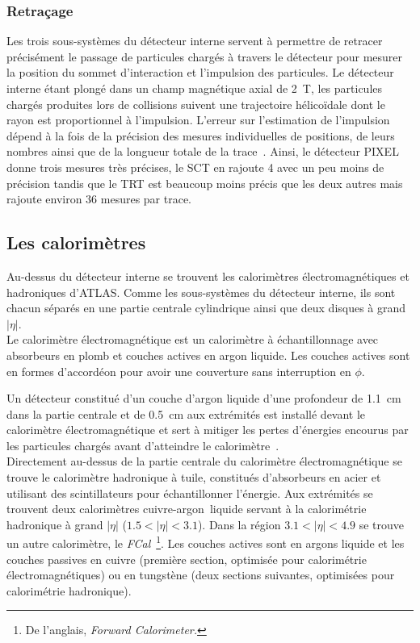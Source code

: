 \subsubsection{Retraçage}

Les trois sous-systèmes du détecteur interne servent à permettre de
retracer précisément le passage de particules chargés à travers le
détecteur pour mesurer la position du sommet d'interaction et
l'impulsion des particules. Le détecteur interne étant plongé dans un
champ magnétique axial de 2~T, les particules chargés produites lors
de collisions suivent une trajectoire hélicoïdale dont le rayon est
proportionnel à l'impulsion. L'erreur sur l'estimation de l'impulsion
dépend à la fois de la précision des mesures individuelles de
positions, de leurs nombres ainsi que de la longueur totale de la
trace~\cite{olive_detectors_2014}. Ainsi, le détecteur PIXEL donne
trois mesures très précises, le SCT en rajoute 4 avec un peu moins de
précision tandis que le TRT est beaucoup moins précis que les deux autres mais
rajoute environ 36 mesures par trace.

\subsection{Les calorimètres}
\label{sec:lhc_atlas:atlas:calo}

Au-dessus du détecteur interne se trouvent les calorimètres
électromagnétiques et hadroniques d'ATLAS. Comme les sous-systèmes du
détecteur interne, ils sont chacun séparés en une partie centrale
cylindrique ainsi que deux disques à grand $|\eta|$. \\

Le calorimètre électromagnétique est un calorimètre à échantillonnage
avec absorbeurs en plomb et couches actives en argon liquide. Les
couches actives sont en formes d'accordéon pour avoir une couverture
sans interruption en $\phi$. 

Un détecteur constitué d'un couche
d'argon liquide d'une profondeur de 1.1~cm dans la partie centrale et
de 0.5~cm aux extrémités est installé devant le calorimètre
électromagnétique et sert à mitiger les pertes d'énergies encourus par
les particules chargés avant d'atteindre le
calorimètre~\cite{andrieux_construction_2002}. \\

Directement au-dessus de la partie centrale du calorimètre
électromagnétique se trouve le calorimètre hadronique à tuile,
constitués d'absorbeurs en acier et utilisant des scintillateurs pour
échantillonner l'énergie. Aux extrémités se trouvent deux calorimètres
cuivre-argon~liquide servant à la calorimétrie hadronique à grand
$|\eta|$ ($1.5 < |\eta| < 3.1$). Dans la région $3.1 < |\eta| < 4.9$
se trouve un autre calorimètre, le \emph{FCal}~\footnote{De l'anglais,
  \emph{Forward Calorimeter.}}. Les couches actives sont en argons
liquide et les couches passives en cuivre (première section, optimisée
pour calorimétrie électromagnétiques) ou en tungstène (deux sections
suivantes, optimisées pour calorimétrie hadronique).

